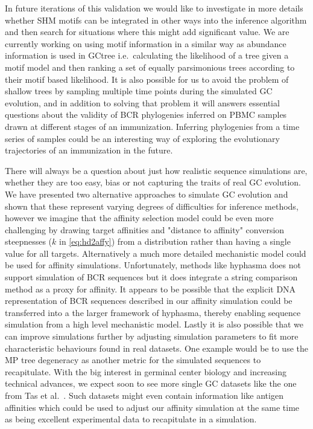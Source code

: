 In future iterations of this validation we would like to investigate in more details whether SHM motifs can be integrated in other ways into the inference algorithm and then search for situations where this might add significant value.
We are currently working on using motif information in a similar way as abundance information is used in GCtree i.e.\ calculating the likelihood of a tree given a motif model and then ranking a set of equally parsimonious trees according to their motif based likelihood.
It is also possible for us to avoid the problem of shallow trees by sampling multiple time points during the simulated GC evolution, and in addition to solving that problem it will answers essential questions about the validity of BCR phylogenies inferred on PBMC samples drawn at different stages of an immunization.
Inferring phylogenies from a time series of samples could be an interesting way of exploring the evolutionary trajectories of an immunization in the future.

There will always be a question about just how realistic sequence simulations are, whether they are too easy, bias or not capturing the traits of real GC evolution.
We have presented two alternative approaches to simulate GC evolution and shown that these represent varying degrees of difficulties for inference methods, however we imagine that the affinity selection model could be even more challenging by drawing target affinities and "distance to affinity" conversion steepnesses ($k$ in \eqref{eq:hd2affy}) from a distribution rather than having a single value for all targets.
Alternatively a much more detailed mechanistic model could be used for affinity simulations.
Unfortunately, methods like hyphasma \cite{robert2017simulate} does not support simulation of BCR sequences but it does integrate a string comparison method as a proxy for affinity.
It appears to be possible that the explicit DNA representation of BCR sequences described in our affinity simulation could be transferred into a the larger framework of hyphasma, thereby enabling sequence simulation from a high level mechanistic model.
Lastly it is also possible that we can improve simulations further by adjusting simulation parameters to fit more characteristic behaviours found in real datasets.
One example would be to use the MP tree degeneracy as another metric for the simulated sequences to recapitulate.
With the big interest in germinal center biology and increasing technical advances, we expect soon to see more single GC datasets like the one from Tas et al.\ \cite{tas2016visualizing}.
Such datasets might even contain information like antigen affinities which could be used to adjust our affinity simulation at the same time as being excellent experimental data to recapitulate in a simulation.


